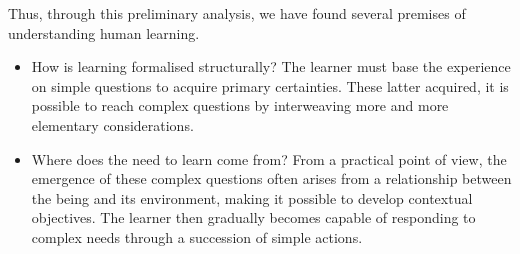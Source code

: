 Thus, through this preliminary analysis, we have found several premises of understanding human learning.

\begin{itemize}
    \item How is learning formalised structurally?
    The learner must base the experience on simple questions to acquire primary certainties. These latter acquired, it is possible to reach complex questions by interweaving more and more elementary considerations.
    \item Where does the need to learn come from?
    From a practical point of view, the emergence of these complex questions often arises from a relationship between the being and its environment, making it possible to develop contextual objectives. The learner then gradually becomes capable of responding to complex needs through a succession of simple actions.
\end{itemize}
 



